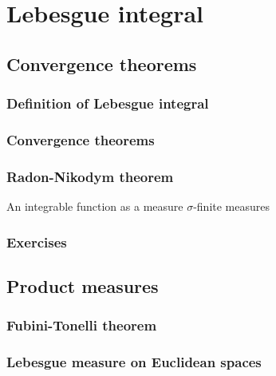 \documentclass{../../large}
\begin{document}
\part{Lebesgue integral}


\chapter{Convergence theorems}
\section{Definition of Lebesgue integral}
\section{Convergence theorems}


\begin{prb}
\end{prb}




\section{Radon-Nikodym theorem}

An integrable function as a measure
$\sigma$-finite measures


\section*{Exercises}
\begin{prb}
\end{prb}




\chapter{Product measures}
\section{Fubini-Tonelli theorem}
\section{Lebesgue measure on Euclidean spaces}
\end{document}
